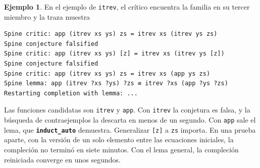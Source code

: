 \documentclass[11pt,a4paper]{article}
\newcommand{\isa}[1]{\texttt{#1}}
\newcommand{\cmd}[1]{\textbf{\texttt{#1}}}
\theoremstyle{definition}
\newtheorem{ejemplo}[definicion]{Ejemplo}
\theoremstyle{remark}
\begin{document}
\begin{ejemplo}
En el ejemplo de \isa{itrev}, el crítico encuentra la familia en su tercer miembro
y la traza muestra
\begin{lstlisting}[deletekeywords={lemma,with}]
Spine critic: app (itrev xs ys) zs = itrev xs (itrev ys zs)
Spine conjecture falsified
Spine critic: app (itrev xs ys) [z] = itrev xs (itrev ys [z])
Spine conjecture falsified
Spine critic: app (itrev xs ys) zs = itrev xs (app ys zs)
Spine lemma: app (itrev ?xs ?ys) ?zs ≡ itrev ?xs (app ?ys ?zs)
Restarting completion with lemma: ...
\end{lstlisting}
Las funciones candidatas son \isa{itrev} y \isa{app}. Con \isa{itrev} la
conjetura es falsa, y la búsqueda de contraejemplos la descarta en menos de un
segundo. Con \isa{app} sale el lema, que \cmd{induct\_auto} demuestra.
Generalizar \isa{[z]} a \isa{zs} importa. En una prueba aparte, con la versión
de un solo elemento entre las ecuaciones iniciales, la compleción no terminó en
siete minutos. Con el lema general, la compleción reiniciada converge en unos
segundos.
\end{ejemplo}
\end{document}
